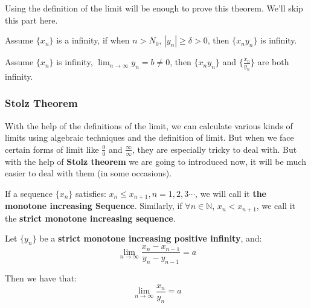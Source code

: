 Using the definition of the limit will be enough to prove this theorem. We'll skip this part here.

\begin{theorem}
Assume $\{x_n\}$ is a infinity, if when $n>N_0$, $|y_n| \ge \delta >0$, then $\{x_n y_n\}$ is infinity.
\end{theorem}

\begin{inference}
Assume $\{x_n\}$ is infinity, $\lim_{n \to \infty} y_n = b \neq 0$, then $\{x_n y_n\}$ and $\{\frac{x_n}{y_n}\}$ are both infinity.
\end{inference}

\subsubsection{Stolz Theorem}

With the help of the definitions of the limit, we can calculate various kinds of limits using algebraic techniques and the definition of limit. But when we face certain forms of limit like $\frac{0}{0}$ and $\frac{\infty}{\infty}$, they are especially tricky to deal with. But with the help of \textbf{Stolz theorem} we are going to introduced now, it will be much easier to deal with them (in some occasions).

\begin{definition}
If a sequence $\{x_n\}$ satisfies: $x_n \leq x_{n+1}, n=1,2,3\cdots$, we will call it \textbf{the monotone increasing Sequence}. Similarly, if $\forall n \in \mathbb{N}$, $x_n < x_{n+1}$, we call it the \textbf{strict monotone increasing sequence}.
\end{definition}

\begin{theorem}
Let $\{y_n\}$ be a \textbf{strict monotone increasing positive infinity}, and:
\[
\lim_{n \to \infty} \frac{x_n -x_{n-1}}{y_n-y_{n-1}}=a
\]

Then we have that:
\[\lim_{n \to \infty}\frac{x_n}{y_n}=a\]

\end{theorem}


